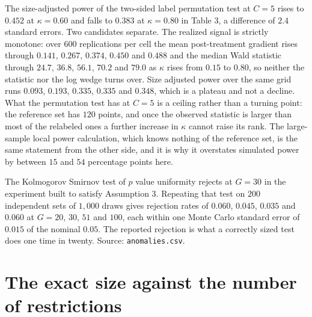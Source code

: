 \documentclass[12pt]{article}
\theoremstyle{definition}
\numberwithin{equation}{section}
\begin{document}
The size-adjusted power of the two-sided label permutation test at $C = 5$ rises
to $0.452$ at $\kappa = 0.60$ and falls to $0.383$ at $\kappa = 0.80$ in Table
3, a difference of $2.4$ standard errors. Two candidates separate.
The realized signal is strictly monotone: over $600$ replications per cell the
mean post-treatment gradient rises through $0.141$, $0.267$, $0.374$, $0.450$
and $0.488$ and the median Wald statistic through $24.7$, $36.8$, $56.1$, $70.2$
and $79.0$ as $\kappa$ rises from $0.15$ to $0.80$, so neither the statistic nor
the log wedge turns over. Size adjusted power over the same grid runs $0.093$,
$0.193$, $0.335$, $0.335$ and $0.348$, which is a plateau and not a decline.
What the permutation test has at $C = 5$ is a ceiling rather than a turning
point: the reference set has $120$ points, and once the observed statistic is
larger than most of the relabeled ones a further increase in $\kappa$ cannot
raise its rank. The large-sample local power calculation, which knows nothing of
the reference set, is the same statement from the other side, and it is why it
overstates simulated power by between $15$ and $54$ percentage points here.

The Kolmogorov Smirnov test of $p$ value uniformity rejects at $G = 30$ in the
experiment built to satisfy Assumption 3. Repeating that test on $200$
independent sets of $1{,}000$ draws gives rejection rates of $0.060$, $0.045$,
$0.035$ and $0.060$ at $G = 20$, $30$, $51$ and $100$, each within one Monte
Carlo standard error of $0.015$ of the nominal $0.05$. The reported rejection is
what a correctly sized test does one time in twenty. Source:
\texttt{anomalies.csv}.

\section{The exact size against the number of restrictions}
\end{document}
